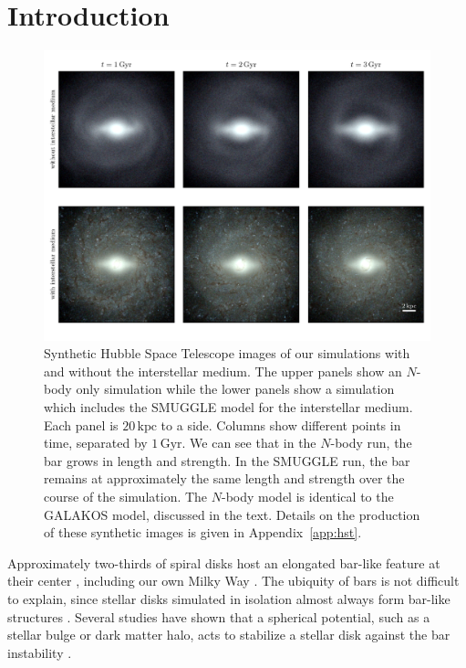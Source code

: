 \documentclass[fleqn,usenatbib]{mnras}
\newcommand{\Nbody}{$N$-body}
\begin{document}
\section{Introduction}
\label{sec:intro}
\begin{figure}
    \centering
    \includegraphics[width=\textwidth]{fig/mockHST.pdf}
    \caption{Synthetic Hubble Space Telescope images of our simulations with and
    without the interstellar medium. The upper panels show an \Nbody{} only
    simulation while the lower panels show a simulation which includes the
    SMUGGLE model for the interstellar medium. Each panel is $20\,\textrm{kpc}$
    to a side. Columns show different points in time, separated by
    $1\,\textrm{Gyr}$. We can see that in the \Nbody{} run, the bar grows in
    length and strength. In the SMUGGLE run, the bar remains at approximately
    the same length and strength over the course of the simulation. The \Nbody{}
    model is identical to the GALAKOS model, discussed in the text. Details on
    the production of these synthetic images is given in Appendix~\ref{app:hst}.}\label{fig:overview}
\end{figure}

Approximately two-thirds of spiral disks host an elongated bar-like feature at
their center \citep{2000AJ....119..536E, 2007ApJ...657..790M}, including our own
Milky Way \citep{1957AJ.....62...19J, 1991ApJ...379..631B}. The ubiquity of bars
is not difficult to explain, since stellar disks simulated in isolation almost
always form bar-like structures \citep{1971ApJ...168..343H}. Several studies
have shown that a spherical potential, such as a stellar bulge or dark matter
halo, acts to stabilize a stellar disk against the bar instability
\citep{1973ApJ...186..467O, 1976AJ.....81...30H}.
\end{document}
